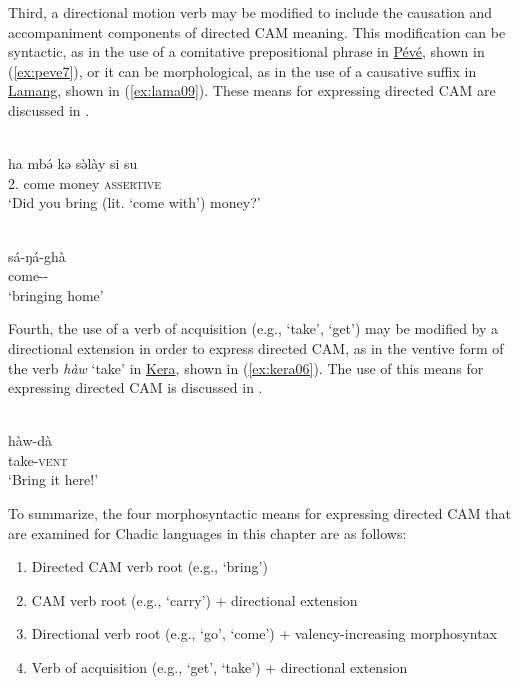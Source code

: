 Third, a directional motion verb may be modified to include the causation and accompaniment components of directed CAM meaning. This modification can be syntactic, as in the use of a comitative prepositional phrase in \hyperref[peve]{Pévé}, shown in (\ref{ex:peve7}), or it can be morphological, as in the use of a causative suffix in \hyperref[lama]{Lamang}, shown in (\ref{ex:lama09}). These means for expressing directed CAM are discussed in .

\ea\label{ex:peve7}
 \\
\gll ha mbə́ kə sə̀lày si su \\
2. come  money \textsc{assertive}  \\
\glt `Did you bring (lit. `come with') money?'

\ex\label{ex:lama09}
 \\
\gll sá-ŋá-ghà \\
come-- \\
\glt `bringing home'
\z 

Fourth, the use of a verb of acquisition (e.g., `take', `get') may be modified by a directional extension in order to express directed CAM, as in the ventive form of the verb \textit{hàw} ‘take' in \hyperref[kera]{Kera}, shown in (\ref{ex:kera06}). The use of this means for expressing directed CAM is discussed in .

\ea\label{ex:kera06}
 \\
\gll hàw-dà 	\\
take-\textsc{vent}	\\
\glt `Bring it here!'
\z 

\largerpage
To summarize, the four morphosyntactic means for expressing directed CAM that are examined for Chadic languages in this chapter are as follows:

\begin{enumerate} \itemsep0em 
	\item	Directed CAM verb root (e.g., `bring')
	\item	CAM verb root (e.g., `carry') + directional extension 
	\item	Directional verb root (e.g., `go', `come') + valency-increasing morphosyntax 
	\item	Verb of acquisition (e.g., `get', `take') + directional extension
\end{enumerate}

